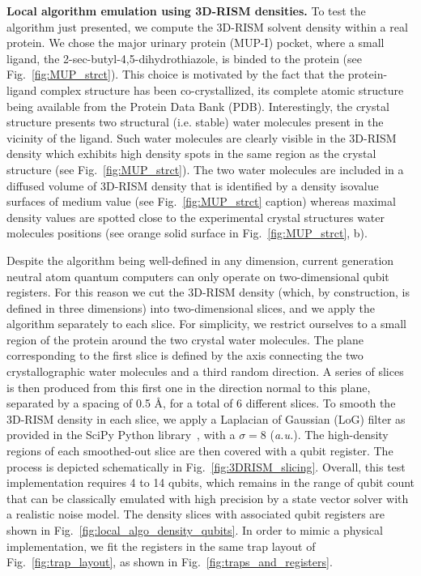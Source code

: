 \documentclass[fleqn,10pt]{wlscirep}
\begin{document}
\textbf{Local algorithm emulation using 3D-RISM densities.}
To test the algorithm just presented, we compute the 3D-RISM solvent density within a real protein. We chose the major urinary protein (MUP-I) pocket, where a small ligand, the 2-sec-butyl-4,5-dihydrothiazole, is binded to the protein (see Fig.~\ref{fig:MUP_strct}). This choice is motivated by the fact that the protein-ligand complex structure has been co-crystallized, its complete atomic structure being available from the Protein Data Bank (PDB). Interestingly, the crystal structure presents two structural (i.e. stable) water molecules present in the vicinity of the ligand. Such water molecules are clearly visible in the 3D-RISM density which exhibits high density spots in the same region as the crystal structure (see Fig.~\ref{fig:MUP_strct}). The two water molecules are included in a diffused volume of 3D-RISM density that is identified by a density isovalue surfaces of medium value (see Fig.~\ref{fig:MUP_strct} caption) whereas maximal density values are spotted close to the experimental crystal structures water molecules positions (see orange solid surface in Fig.~\ref{fig:MUP_strct}, b).

Despite the algorithm being well-defined in any dimension, current generation neutral atom quantum computers can only operate on two-dimensional qubit registers. For this reason we cut the 3D-RISM density (which, by construction, is defined in three dimensions) into two-dimensional slices, and we apply the algorithm separately to each slice. For simplicity, we restrict ourselves to a small region of the protein around the two crystal water molecules. The plane corresponding to the first slice is defined by the axis connecting the two crystallographic water molecules and a third random direction. A series of slices is then produced from this first one in the direction normal to this plane, separated by a spacing of 0.5 \AA, for a total of 6 different slices. To smooth the 3D-RISM density in each slice, we apply a Laplacian of Gaussian (LoG) filter as provided in the SciPy Python library~\cite{scipy}, with a $\sigma = 8$ (\textit{a.u.}). The high-density regions of each smoothed-out slice are then covered with a qubit register. The process is depicted schematically in Fig.~\ref{fig:3DRISM_slicing}. Overall, this test implementation requires 4 to 14 qubits, which remains in the range of qubit count that can be classically emulated with high precision by a state vector solver with a realistic noise model. The density slices with associated qubit registers are shown in Fig.~\ref{fig:local_algo_density_qubits}. In order to mimic a physical implementation, we fit the registers in the same trap layout of Fig.~\ref{fig:trap_layout}, as shown in Fig.~\ref{fig:traps_and_registers}.
\end{document}
